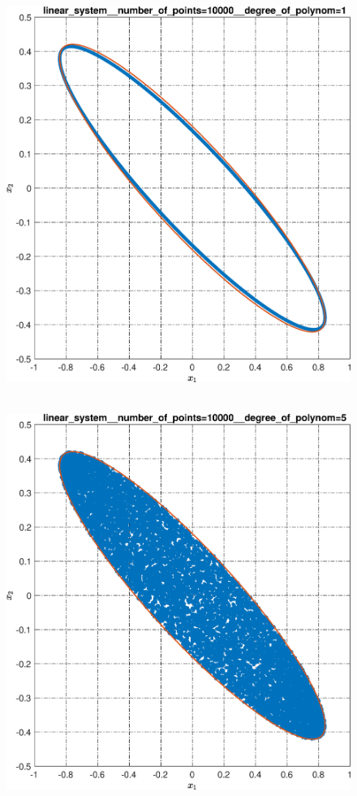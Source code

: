 \documentclass[../main.tex]{subfiles}
\begin{document}
\begin{figure}[ht!]
\begin{minipage}[b]{.3\linewidth}
  		\includegraphics[width=\linewidth]{images/linear_system__number_of_points=10000__degree_of_polynom=1.eps}
  	\end{minipage} 
  	\hfill
  	\begin{minipage}[b]{.3\linewidth} 
  		\small
  		\centering
  		\includegraphics[width=\linewidth]{images/linear_system__number_of_points=10000__degree_of_polynom=5.eps}

\end{minipage}
\end{figure}
\end{document}
